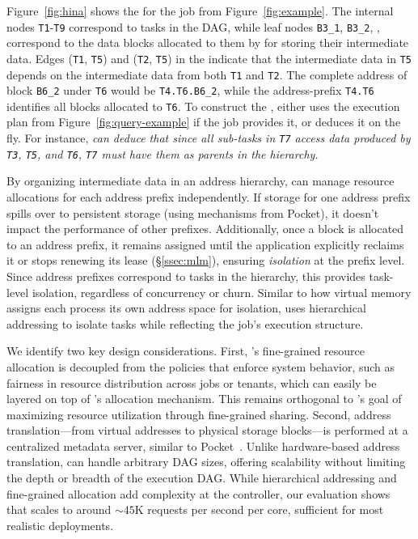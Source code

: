  Figure~\ref{fig:hina} shows the \lh for the job from Figure~\ref{fig:example}. The internal nodes \texttt{T1}-\texttt{T9} correspond to tasks in the DAG, while leaf nodes \texttt{B3\_1}, \texttt{B3\_2}, \etc, correspond to the data blocks allocated to them by \jiffy for storing their intermediate data. Edges (\texttt{T1}, \texttt{T5}) and (\texttt{T2}, \texttt{T5}) in the \lh indicate that the intermediate data in \texttt{T5} depends on the intermediate data from both \texttt{T1} and \texttt{T2}. The complete address of block \texttt{B6\_2} under \texttt{T6} would be \texttt{T4.T6.B6\_2}, while the address-prefix \texttt{T4.T6} identifies all blocks allocated to \texttt{T6}. To construct the \lh, \jiffy either uses the execution plan from Figure~\ref{fig:query-example} if the job provides it, or deduces it on the fly. For instance, \sl can deduce that since all sub-tasks in \texttt{T7} access data produced by \texttt{T3}, \texttt{T5}, and \texttt{T6}, \texttt{T7} must have them as parents in the hierarchy.

By organizing intermediate data in an address hierarchy, \jiffy can manage resource allocations for each address prefix independently. If storage for one address prefix spills over to persistent storage (using mechanisms from Pocket), it doesn't impact the performance of other prefixes. Additionally, once a block is allocated to an address prefix, it remains assigned until the application explicitly reclaims it or stops renewing its lease (\S\ref{ssec:mlm}), ensuring \textit{isolation} at the prefix level. Since address prefixes correspond to tasks in the hierarchy, this provides task-level isolation, regardless of concurrency or churn. Similar to how virtual memory assigns each process its own address space for isolation, \jiffy uses hierarchical addressing to isolate tasks while reflecting the job's execution structure.

We identify two key design considerations. First, \jiffy's fine-grained resource allocation is decoupled from the policies that enforce system behavior, such as fairness in resource distribution across jobs or tenants, which can easily be layered on top of \jiffy's allocation mechanism. This remains orthogonal to \jiffy's goal of maximizing resource utilization through fine-grained sharing. Second, address translation—from virtual addresses to physical storage blocks—is performed at a centralized metadata server, similar to Pocket~\cite{pocket}. Unlike hardware-based address translation, \jiffy can handle arbitrary DAG sizes, offering scalability without limiting the depth or breadth of the execution DAG. While hierarchical addressing and fine-grained allocation add complexity at the controller, our evaluation shows that \jiffy scales to around ${\sim}45$K requests per second per core, sufficient for most realistic deployments.

